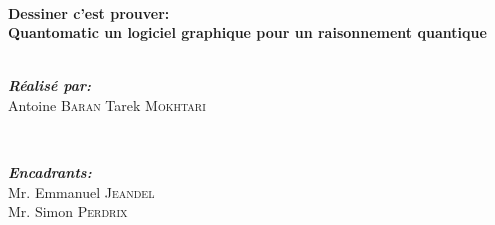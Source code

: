 \begin{titlepage}

\HRule \\[0.4cm]
{ \LARGE \bfseries Dessiner c'est prouver:\\ Quantomatic un logiciel graphique pour un raisonnement quantique}\\[0.4cm] %
\HRule \\[1.5cm]
 
\begin{flushleft}
\begin{minipage}{1\textwidth} %
\begin{flushleft} \large
\qquad\emph{\textbf{Réalisé par:}}\\[0.2cm]
\qquad \qquad Antoine \textsc{Baran}
\qquad \qquad Tarek \textsc{Mokhtari}\\ %
\end{flushleft}
\end{minipage}\\%
[1.5cm]
\begin{minipage}{1\textwidth}
\begin{flushleft} \large
\qquad\emph{\textbf{Encadrants:}} \\ %
\qquad \qquad Mr. Emmanuel \textsc{Jeandel} \qquad \textit{} \\ %
\qquad \qquad Mr. Simon \qquad \textsc{Perdrix} \\ %

\end{flushleft}
\end{minipage}\\[3cm]
\end{flushleft}




\end{titlepage}
